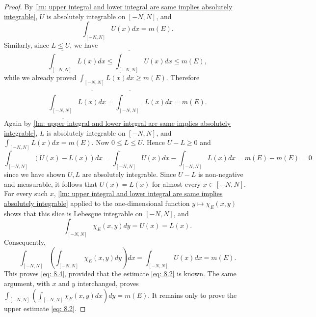 \begin{proof}
By \autoref{lm: upper integral and lower integral are same implies absolutely integrable}, $U$ is absolutely integrable on $[-N, N]$, and
\[
    \int_{[-N,N]}U(x)dx=m(E).
\]
Similarly, since $L\le U$, we have
\[
    \overline{\int_{[-N,N]}}L(x)dx\le\overline{\int_{[-N,N]}}U(x)dx\le m(E),
\]
while we already proved $\underline{\int_{[-N,N]}} L(x)dx\ge m(E)$. Therefore
\[
    \underline{\int_{[-N,N]}} L(x)dx=\overline{\int_{[-N,N]}}L(x)dx=m(E).
\]
Again by \autoref{lm: upper integral and lower integral are same implies absolutely integrable}, $L$ is absolutely integrable on $[-N, N]$, and $\int_{[-N,N]}L(x)dx=m(E)$. Now $0\le L\le U$. Hence $U-L\ge0$ and 
\[
    \int_{[-N,N]}(U(x)-L(x))dx=\int_{[-N,N]}U(x)dx-\int_{[-N,N]}L(x)dx=m(E)-m(E)=0
\]
since we have shown \(U, L\) are absolutely integrable. 
Since $U-L$ is non-negative and measurable, it follows that $U(x)=L(x)$ for almost every $x\in[-N,N]$. For every such $x$, \autoref{lm: upper integral and lower integral are same implies absolutely integrable} applied to the one-dimensional function $y\mapsto\chi_{E}(x,y)$ shows that this slice is Lebesgue integrable on $[-N, N]$, and 
\[
    \int_{[-N,N]}\chi_{E}(x,y)dy=U(x)=L(x).
\]
Consequently,
\[
    \int_{[-N,N]}\left(\int_{[-N,N]}\chi_{E}(x,y)dy\right)dx=\int_{[-N,N]}U(x)dx=m(E).
\]
This proves \autoref{eq: 8.4}, provided that the estimate \autoref{eq: 8.2} is known. The same argument, with $x$ and $y$ interchanged, proves $\int_{[-N,N]}\left(\int_{[-N,N]}\chi_{E}(x,y)dx\right)dy=m(E)$. It remains only to prove the upper estimate \autoref{eq: 8.2}.


\end{proof}
